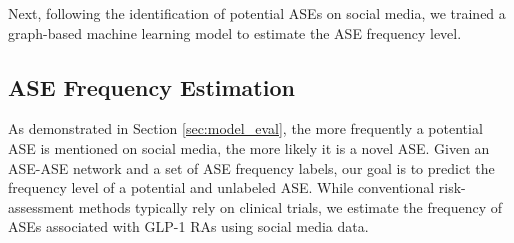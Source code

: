 \documentclass[referee,bst/sn-basic]{sn-jnl}%
\theoremstyle{thmstyletwo}%
\theoremstyle{thmstylethree}%
\begin{document}
\begin{comment}
\begin{table}[h]
    \centering
    \caption{Categories of adverse side effects (ASEs) by normalized mention frequency ($\hat{M_f}$) on social media.}
    \label{tbl:freq_1}
    \begin{tabular}{llll}
    \toprule
    Category   &  Range & Number of ASEs\\
    \midrule
      Very Rare   &  $\hat{M_f} < 0.0001$ & 0 \\
      Rare   & $  0.0001 \leq \hat{M_f} < 0.001$  & 0 \\
      Infrequent   & $ 0.001 \leq \hat{M_f} < 0.01$ & 42 \\
      Frequent   & $0.01 \leq \hat{M_f} < 0.1$ & 24 \\
      Very Frequent   & $\hat{M_f} \geq  0.1$ & 12 \\
    \bottomrule
    \end{tabular}
\end{table}
\end{comment}


Next, following the identification of potential ASEs on social media, we trained a graph-based machine learning model to estimate the ASE frequency level.

\subsection{ASE Frequency Estimation}
\label{subsec:GCN}

As demonstrated in Section \ref{sec:model_eval}, the more frequently a potential ASE is mentioned on social media, the more likely it is a novel ASE. 
Given an ASE-ASE network and a set of ASE frequency labels, our goal is to predict the frequency level of a potential and unlabeled ASE. 
While conventional risk-assessment methods typically rely on clinical trials, we estimate the frequency of ASEs associated with GLP-1 RAs using social media data.
\end{document}
